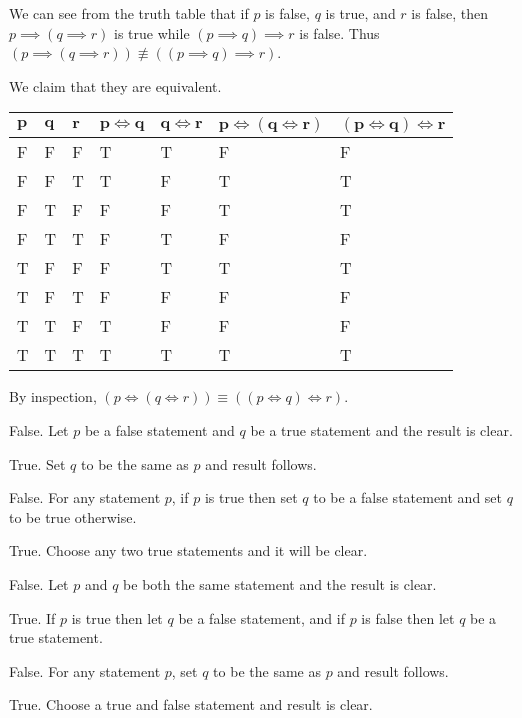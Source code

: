 \begin{questions}
\begin{partquestions}{\alph*}
        We can see from the truth table that if $p$ is false, $q$ is true, and $r$ is false, then $p \implies (q \implies r)$ is true while $(p \implies q) \implies r$ is false. Thus $(p \implies (q \implies r)) \not\equiv ((p \implies q) \implies r)$.

        \item We claim that they are equivalent.
        \begin{table}[H]
            \centering
            \fontsize{7.5pt}{11pt}\selectfont
            \begin{tabular}{|l|l|l||l|l||l|l|}
                \hline
                $\boldsymbol{p}$ & $\boldsymbol{q}$ & $\boldsymbol{r}$ & $\boldsymbol{p \iff q}$ & $\boldsymbol{q \iff r}$ & $\boldsymbol{p \iff (q \iff r)}$ & $\boldsymbol{(p \iff q) \iff r}$ \\ \hline
                F & F & F & T & T & F & F \\ \hline
                F & F & T & T & F & T & T \\ \hline
                F & T & F & F & F & T & T \\ \hline
                F & T & T & F & T & F & F \\ \hline
                T & F & F & F & T & T & T \\ \hline
                T & F & T & F & F & F & F \\ \hline
                T & T & F & T & F & F & F \\ \hline
                T & T & T & T & T & T & T \\ \hline
            \end{tabular}
        \end{table}

        By inspection, $(p \iff (q \iff r)) \equiv ((p \iff q) \iff r)$.
    \end{partquestions}

    \item \begin{partquestions}{\alph*}
        \item False. Let $p$ be a false statement and $q$ be a true statement and the result is clear.
        \item True. Set $q$ to be the same as $p$ and result follows.
        \item False. For any statement $p$, if $p$ is true then set $q$ to be a false statement and set $q$ to be true otherwise.
        \item True. Choose any two true statements and it will be clear.
        \item False. Let $p$ and $q$ be both the same statement and the result is clear.
        \item True. If $p$ is true then let $q$ be a false statement, and if $p$ is false then let $q$ be a true statement.
        \item False. For any statement $p$, set $q$ to be the same as $p$ and result follows.
        \item True. Choose a true and false statement and result is clear.
    \end{partquestions}


\end{questions}
